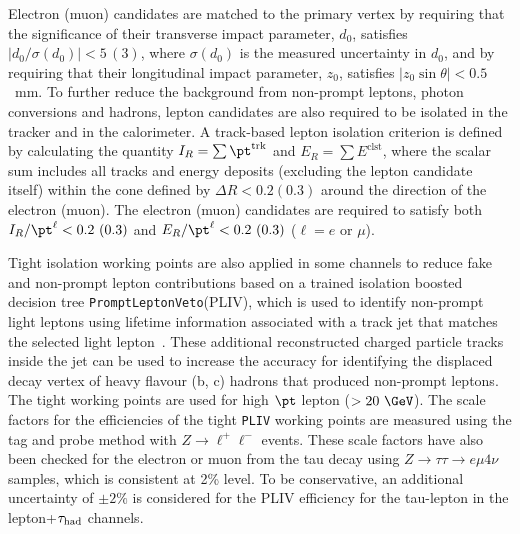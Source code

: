 Electron (muon) candidates are matched to the primary vertex by requiring that the significance of their transverse impact parameter, $d_0$, 
satisfies $|d_0/\sigma(d_0)|<5\,(3)$, where $\sigma(d_0)$ is the measured uncertainty in $d_0$,
and by requiring that their longitudinal impact parameter, $z_0$, satisfies $|z_0 \sin\theta|<0.5$~mm.
To further reduce the background from non-prompt leptons, photon conversions and hadrons, lepton candidates are also required to be isolated 
in the tracker and in the calorimeter.
A track-based lepton isolation criterion is defined by calculating the quantity $I_R = \sum \pt^{\textrm{trk}}$ and $E_R = \sum E^{\textrm{clst}}$, where
the scalar sum includes all tracks and energy deposits (excluding the lepton candidate itself) within the cone defined by $\Delta R<0.2 (0.3)$ around the %
direction of the electron (muon). The electron (muon) candidates are required to satisfy both
$I_R/\pt^\ell < 0.2~(0.3)$ and $E_R/\pt^\ell < 0.2~(0.3)$ ($\ell=e$ or $\mu$).

Tight isolation working points are also applied in some channels to reduce fake and non-prompt lepton contributions based on a trained isolation boosted decision tree \texttt{PromptLeptonVeto}(PLIV), which is used to identify non-prompt light leptons using lifetime information associated with a track jet that matches the selected light lepton~\cite{ATLAS-CONF-2019-045}. These additional reconstructed charged particle tracks inside the jet can be
used to increase the accuracy for identifying the displaced decay vertex of heavy flavour (b, c) hadrons that produced non-prompt leptons.
The tight working points are used for high $\pt$ lepton ($>20~\GeV$).
The scale factors for the efficiencies of the tight \texttt{PLIV} working points are measured using the tag and probe method
with $Z\rightarrow \ell^+\ell^-$ events. These scale factors have also been checked for the electron or muon from the tau decay
using $Z\rightarrow\tau\tau\rightarrow e\mu4\nu$ samples, which is consistent at 2\% level. To be conservative, an
additional uncertainty of $\pm 2\%$ is considered for the PLIV efficiency for the tau-lepton in the lepton+$\tau_\text{had}$ channels.

